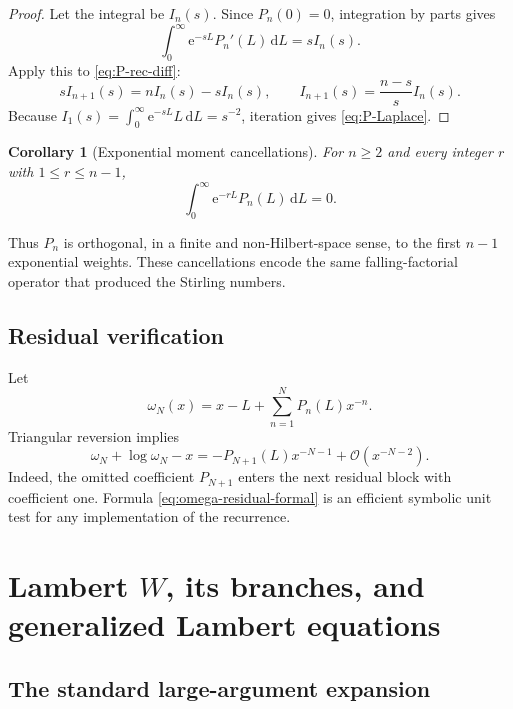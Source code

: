 \documentclass[11pt]{article}
\theoremstyle{pltheorem}
\newtheorem{corollary}[theorem]{Corollary}
\newcommand{\dd}{\,\mathrm d}
\newcommand{\e}{\mathrm e}
\newcommand{\bigO}{\mathcal O}
\begin{document}
\begin{proof}
Let the integral be \(I_n(s)\).  Since \(P_n(0)=0\), integration by parts gives
\[
 \int_0^\infty\e^{-sL}P_n'(L)\dd L=sI_n(s).
\]
Apply this to \cref{eq:P-rec-diff}:
\[
 sI_{n+1}(s)=nI_n(s)-sI_n(s),
 \qquad
 I_{n+1}(s)=\frac{n-s}{s}I_n(s).
\]
Because \(I_1(s)=\int_0^\infty\e^{-sL}L\dd L=s^{-2}\), iteration gives
\cref{eq:P-Laplace}.
\end{proof}

\begin{corollary}[Exponential moment cancellations]\label{cor:P-moment-zero}
For \(n\ge2\) and every integer \(r\) with \(1\le r\le n-1\),
\begin{equation}\label{eq:P-moment-zero}
 \int_0^\infty\e^{-rL}P_n(L)\dd L=0.
\end{equation}
\end{corollary}

Thus \(P_n\) is orthogonal, in a finite and non-Hilbert-space sense, to the first \(n-1\) exponential weights.  These cancellations encode the same falling-factorial operator that produced the Stirling numbers.

\subsection{Residual verification}

Let
\begin{equation}\label{eq:omega-trunc}
 \omega_N(x)=x-L+\sum_{n=1}^{N}P_n(L)x^{-n}.
\end{equation}
Triangular reversion implies
\begin{equation}\label{eq:omega-residual-formal}
 \omega_N+\log\omega_N-x
 =-P_{N+1}(L)x^{-N-1}+\bigO(x^{-N-2}).
\end{equation}
Indeed, the omitted coefficient \(P_{N+1}\) enters the next residual block with coefficient one.  Formula \cref{eq:omega-residual-formal} is an efficient symbolic unit test for any implementation of the recurrence.

\section{\texorpdfstring{Lambert \(W\), its branches, and generalized Lambert equations}{Lambert W, its branches, and generalized Lambert equations}}
\label{sec:Lambert-W}

\subsection{The standard large-argument expansion}
\end{document}

